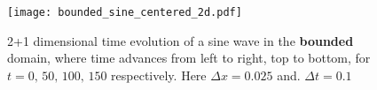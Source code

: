 \begin{figure}[htbp]
	\centering
	\texttt{[image: bounded\_sine\_centered\_2d.pdf]}
	\caption{2+1 dimensional time evolution of a sine wave in the \textbf{bounded} domain, where time advances from left to right, top to bottom, for $t = 0,\, 50,\, 100,\, 150$ respectively. Here $\Delta x = 0.025$ and. $\Delta t = 0.1$}
	\label{fig:boundedsine2d}
\end{figure}


